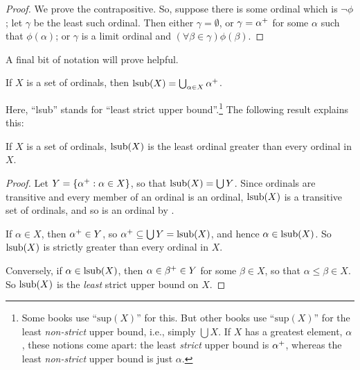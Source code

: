\documentclass[../../../include/open-logic-section]{subfiles}
\begin{document}
\begin{proof}
We prove the contrapositive. So, suppose there is some ordinal which
is $\lnot\phi$; let $\gamma$ be the least such ordinal. Then either
$\gamma = \emptyset$, or $\gamma = \alpha^{+}$ for some $\alpha$
such that $\phi(\alpha)$; or $\gamma$ is a limit ordinal and $(\forall
\beta \in \gamma)\phi(\beta)$.
\end{proof}

A final bit of notation will prove helpful.

\begin{defn}
If $X$ is a  set of ordinals, then $\operatorname*{\mathrm{lsub}}(X) = \bigcup_{\alpha
\in X} \alpha^{+}$.
\end{defn}

Here, ``lsub'' stands for ``least strict upper bound''.\footnote{Some
books use ``$\text{sup}(X)$'' for this.  But other books use
``$\text{sup}(X)$'' for the least \emph{non-strict} upper bound, i.e.,
simply $\bigcup X$. If $X$ has a greatest element, $\alpha$, these
notions come apart: the least \emph{strict} upper bound is
$\alpha^{+}$, whereas the least \emph{non-strict} upper bound is
just $\alpha$.}  The following result explains this:

\begin{prop}
If $X$ is a set of ordinals, $\operatorname*{\mathrm{lsub}}(X)$ is the least ordinal
greater than every ordinal in $X$.
\end{prop}

\begin{proof}
Let $Y = \{ \alpha^{+} : \alpha \in X \}$, so that
$\operatorname*{\mathrm{lsub}}(X) = \bigcup Y$. Since ordinals are transitive and every
member of an ordinal is an ordinal, $\operatorname*{\mathrm{lsub}}(X)$ is a transitive
set of ordinals, and so is an ordinal by
. 

If $\alpha \in X$, then $\alpha^{+} \in Y$, so $\alpha^{+}
\subseteq \bigcup Y = \operatorname*{\mathrm{lsub}}(X)$, and hence $\alpha \in
\operatorname*{\mathrm{lsub}}(X)$. So $\operatorname*{\mathrm{lsub}}(X)$ is strictly greater than every
ordinal in $X$.

Conversely, if $\alpha \in \operatorname*{\mathrm{lsub}}(X)$, then $\alpha \in
\beta^{+} \in Y$ for some $\beta \in X$, so that $\alpha \leq
\beta \in X$. So $\operatorname*{\mathrm{lsub}}(X)$ is the \emph{least} strict upper
bound on $X$.
\end{proof}
\end{document}
